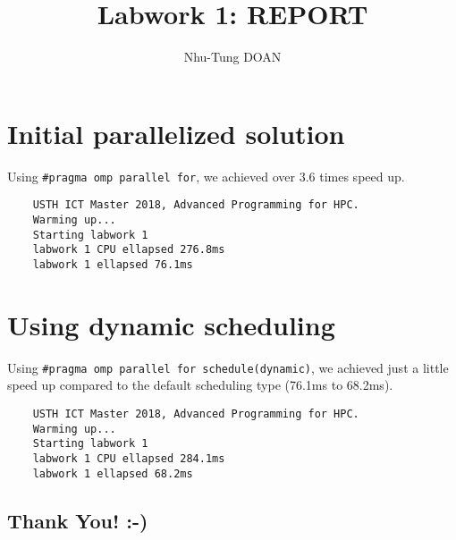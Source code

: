 \documentclass[10pt]{article}
\title {Labwork 1: REPORT}
\author{Nhu-Tung DOAN}
\date{}
\begin{document}
\maketitle

\section{Initial parallelized solution}

Using \verb+#pragma omp parallel for+, we achieved over 3.6 times speed up.

\begin{verbatim}
    USTH ICT Master 2018, Advanced Programming for HPC.
    Warming up...
    Starting labwork 1
    labwork 1 CPU ellapsed 276.8ms
    labwork 1 ellapsed 76.1ms
\end{verbatim}

\section{Using dynamic scheduling}
Using \verb+#pragma omp parallel for schedule(dynamic)+, we achieved just a little speed up compared to the default scheduling type (76.1ms to 68.2ms).

\begin{verbatim}
    USTH ICT Master 2018, Advanced Programming for HPC.
    Warming up...
    Starting labwork 1
    labwork 1 CPU ellapsed 284.1ms
    labwork 1 ellapsed 68.2ms
\end{verbatim}

\subsection*{Thank You! :-)}
\end{document}
